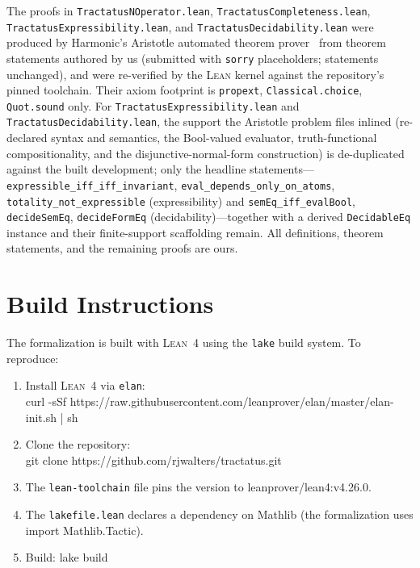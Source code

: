 \documentclass[jsl,bibother]{asl}
\theoremstyle{definition}
\theoremstyle{remark}
\newcommand{\Lean}{\textsc{Lean}}
\begin{document}
The proofs in \texttt{TractatusNOperator.lean},
\texttt{TractatusCompleteness.lean},
\texttt{TractatusExpressibility.lean}, and
\texttt{TractatusDecidability.lean} were produced by Harmonic's
Aristotle automated theorem prover~\cite{harmonic2026} from
theorem statements authored by us (submitted with \texttt{sorry}
placeholders; statements unchanged), and were re-verified by the
\Lean{} kernel against the repository's pinned toolchain.  Their
axiom footprint is \texttt{propext}, \texttt{Classical.choice},
\texttt{Quot.sound} only.  For
\texttt{TractatusExpressibility.lean} and
\texttt{TractatusDecidability.lean}, the support the Aristotle
problem files inlined (re-declared syntax and semantics, the
Bool-valued evaluator, truth-functional compositionality, and the
disjunctive-normal-form construction) is de-duplicated against the
built development; only the headline
statements---\texttt{expressible\_iff\_iff\_invariant},
\texttt{eval\_depends\_only\_on\_atoms},
\texttt{totality\_not\_expressible} (expressibility) and
\texttt{semEq\_iff\_evalBool}, \texttt{decideSemEq},
\texttt{decideFormEq} (decidability)---together with a derived
\texttt{DecidableEq} instance and their finite-support
scaffolding remain.  All definitions, theorem statements, and the
remaining proofs are ours.


\appendix

\section{Build Instructions}
\label{app:build}

The formalization is built with \Lean~4 using the \texttt{lake}
build system.  To reproduce:

\begin{enumerate}[nosep]
  \item Install \Lean~4 via \texttt{elan}:\\
    {\small\ttfamily curl -sSf https://raw.githubusercontent.com/\allowbreak{}leanprover/\allowbreak{}elan/\allowbreak{}master/\allowbreak{}elan-init.sh | sh}
  \item Clone the repository:\\
    {\small\ttfamily git clone https://github.com/rjwalters/tractatus.git}
  \item The \texttt{lean-toolchain} file pins the version to
    {\small\ttfamily leanprover/lean4:v4.26.0}.
  \item The \texttt{lakefile.lean} declares a dependency on
    Mathlib (the formalization uses
    {\small\ttfamily import Mathlib.Tactic}).
  \item Build: {\small\ttfamily lake build}
\end{enumerate}
\end{document}
